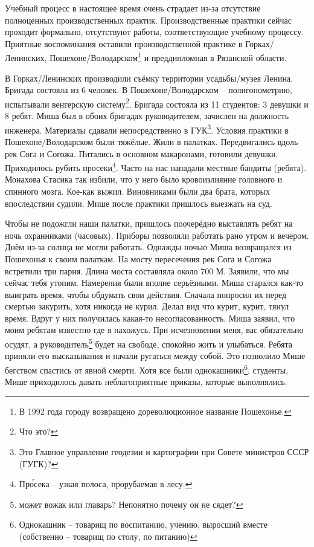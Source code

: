 Учебный процесс в настоящее время очень страдает из-за отсутствие полноценных производственных практик. Производственные практики сейчас проходит формально, отсутствуют работы, соответствующие учебному процессу. Приятные воспоминания оставили производственной практике в Горках\-/Ленинских, Пошехоне\-/Володарском\footnote{В 1992 года городу возвращено дореволюционное название Пошехонье.} и преддипломная в Рязанской области.

В Горках\-/Ленинских производили съёмку территории усадьбы\-/музея Ленина. Бригада состояла из 6 человек. В Пошехоне\-/Володарском \--- полигонометрию, испытывали венгерскую систему\footnote{Что это?}. Бригада состояла из 11 студентов: 3 девушки и 8 ребят. Миша был в обоих бригадах руководителем, зачислен на должность инженера. Материалы сдавали непосредственно в ГУК\footnote{Это Главное управление геодезии и картографии при Совете министров СССР (ГУГК)?}. Условия практики в Пошехоне\-/Володарском были тяжёлые. Жили в палатках. Передвигались вдоль рек Сога и Согожа. Питались в основном макаронами, готовили девушки. Приходилось рубить просеки\footnote{Пр\'{о}сека \--- узкая полоса, прорубаемая в лесу.}. Часто на нас нападали местные бандиты (ребята). Монахова Стасика так избили, что у него было кровоизлияние головного и спинного мозга. Кое-как выжил. Виновниками были два брата, которых впоследствии судили. Мише после практики пришлось выезжать на суд. 

Чтобы не подожгли наши палатки, пришлось поочерёдно выставлять ребят на ночь охранниками (часовых). Приборы позволяли работать рано утром и вечером. Днём из-за солнца не могли работать. Однажды ночью Миша возвращался из Пошехонья к своим палаткам. На мосту пересечения рек Сога и Согожа встретили три парня. Длина моста составляла около 700 М. Заявили, что мы сейчас тебя утопим. Намерения были вполне серьёзными. Миша старался как-то выиграть время, чтобы обдумать свои действия. Сначала попросил их перед смертью закурить, хотя никогда не курил. Делал вид что курит, курит, тянул время. Вдруг у них получилась какая-то несогласованность. Миша заявил, что моим ребятам известно где я нахожусь. При исчезновении меня, вас обязательно осудят, а руководитель\footnote{может вожак или главарь? Непонятно почему он не сядет?} будет на свободе, спокойно жить и улыбаться. Ребята приняли его высказывания и начали ругаться между собой. Это позволило Мише бегством спастись от явной смерти. Хотя все были однокашники\footnote{Однокашник \--- товарищ по воспитанию, учению, выросший вместе (собственно \--- товарищ по столу, по питанию)}, студенты, Мише приходилось давать неблагоприятные приказы, которые выполнялись.

